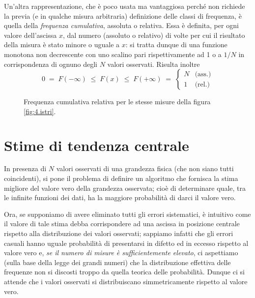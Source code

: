 %
Un'altra rappresentazione, che \`e poco usata ma vantaggiosa
perch\'e non richiede la previa (e in qualche misura
arbitraria) definizione delle classi di frequenza, \`e
quella della \emph{frequenza cumulativa}, assoluta o
relativa.%
\label{def:4.frcure}
Essa \`e definita, per ogni valore dell'ascissa $x$, dal
numero (assoluto o relativo) di volte per cui il risultato
della misura \`e stato minore o uguale a $x$: si tratta
dunque di una funzione monotona non decrescente con uno
scalino pari rispettivamente ad 1 o a $1 / N$ in
corrispondenza di ognuno degli $N$ valori osservati.
Risulta inoltre
\begin{equation*}
  0 \; = \; F(-\infty) \; \le \; F(x) \; \le \; F(+\infty)
  \; = \;
  \begin{cases}
      N & \text{(ass.)} \\[4mm]
      1 & \text{(rel.)}
  \end{cases}
\end{equation*}%
\begin{figure}[htbp]
  \vspace*{2ex}
  \begin{center} {
    
  } \end{center}
  \caption[Frequenza cumulativa relativa di un campione
    di misure]{Frequenza cumulativa relativa per le stesse
    misure della figura \ref{fig:4.istri}.}
\end{figure}

\section{Stime di tendenza centrale}%
%
\label{ch:4.tecen}
In presenza di $N$ valori osservati di una grandezza fisica
(che non siano tutti coincidenti), si pone il problema di
definire un algoritmo che fornisca la stima migliore del
valore vero della grandezza osservata; cio\`e di determinare
quale, tra le infinite funzioni dei dati, ha la maggiore
probabilit\`a di darci il valore vero.

Ora, se supponiamo di avere eliminato tutti gli errori
sistematici, \`e intuitivo come il valore di tale stima
debba corrispondere ad una ascissa in posizione centrale
rispetto alla distribuzione dei valori osservati; sappiamo
infatti che gli errori casuali hanno uguale probabilit\`a di
presentarsi in difetto ed in eccesso rispetto al valore vero
e, \emph{se il numero di misure \`e sufficientemente
  elevato}, ci aspettiamo (sulla base della legge dei grandi
numeri)%
che la distribuzione effettiva delle frequenze non si
discosti troppo da quella teorica delle probabilit\`a.
Dunque ci si attende che i valori osservati si
distribuiscano simmetricamente rispetto al valore vero.

